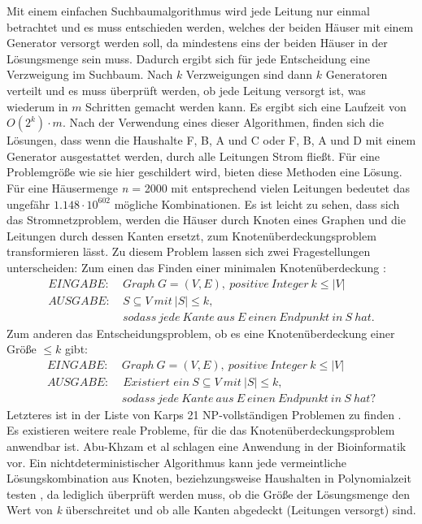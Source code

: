 Mit einem einfachen Suchbaumalgorithmus wird jede Leitung nur einmal betrachtet und es muss entschieden werden, welches der beiden Häuser mit einem Generator versorgt werden soll, da mindestens eins der beiden Häuser in der Lösungsmenge sein muss. Dadurch ergibt sich für jede Entscheidung eine Verzweigung im Suchbaum. Nach $k$ Verzweigungen sind dann $k$ Generatoren verteilt und es muss überprüft werden, ob jede Leitung versorgt ist, was wiederum in $m$ Schritten gemacht werden kann. Es ergibt sich eine Laufzeit von $O(2^{k}) \cdot m$.
Nach der Verwendung eines dieser Algorithmen, finden sich die Lösungen, dass wenn die Haushalte F, B, A und C oder F, B, A und D mit einem Generator ausgestattet werden, durch alle Leitungen Strom fließt. Für eine Problemgröße wie sie hier geschildert wird, bieten diese Methoden eine Lösung. Für eine Häusermenge \emph{n} = 2000 mit entsprechend vielen Leitungen bedeutet das ungefähr $1.148 \cdot 10^{602}$ mögliche Kombinationen.
Es ist leicht zu sehen, dass sich das Stromnetzproblem, werden die Häuser durch Knoten eines Graphen und die Leitungen durch dessen Kanten ersetzt, zum Knotenüberdeckungsproblem transformieren lässt. Zu diesem Problem lassen sich zwei Fragestellungen unterscheiden: Zum einen das Finden einer minimalen Knotenüberdeckung \cite{trees}:
\begin{align*}
EINGABE: &\ Graph\ G=(V,E),\ positive\ Integer\ k\leq |V|\\
AUSGABE: &\ S\subseteq V\ mit\ |S|\leq k,\\
&\ sodass\ jede\ Kante\ aus\ E\ einen\ Endpunkt\ in\ S\ hat.
\end{align*}
Zum anderen das Entscheidungsproblem, ob es eine Knotenüberdeckung einer Größe $\leq k$ gibt:
\begin{align*}
EINGABE: &\ Graph\ G=(V,E),\ positive\ Integer\ k\leq |V|\\
AUSGABE: &\textit{ Existiert ein}\ S\subseteq V\ mit\ |S|\leq k,\\
&\ sodass\ jede\ Kante\ aus\ E\ einen\ Endpunkt\ in\ S\ hat?
\end{align*}
Letzteres ist in der Liste von Karps 21 NP-vollständigen Problemen zu finden \cite{karp}.
Es existieren weitere reale Probleme, für die das Knotenüberdeckungsproblem anwendbar ist. Abu-Khzam et al \cite{paper:3} schlagen eine Anwendung in der Bioinformatik vor.
Ein nichtdeterministischer Algorithmus kann jede vermeintliche Lösungskombination aus Knoten, beziehzungsweise Haushalten in Polynomialzeit testen \cite{intract}, da lediglich überprüft werden muss, ob die Größe der Lösungsmenge den Wert von \emph{k} überschreitet und ob alle Kanten abgedeckt (Leitungen versorgt) sind.
